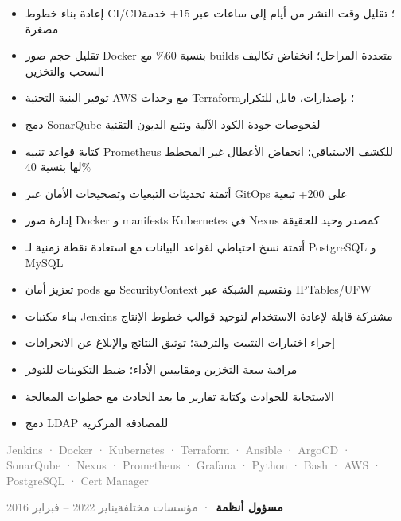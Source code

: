 \documentclass[10pt,a4paper]{article}
\newcommand{\cventry}[3]{\textbf{#1}\ \textcolor{graytext}{· #2}\hfill\textcolor{graytext}{\small #3}\par}
\newcommand{\tagline}[1]{\textcolor{graytext}{\small #1}\par}
\begin{document}
\begin{itemize}
  \item إعادة بناء خطوط CI/CD؛ تقليل وقت النشر من أيام إلى ساعات عبر 15+ خدمة مصغرة
  \item تقليل حجم صور Docker بنسبة 60\% مع builds متعددة المراحل؛ انخفاض تكاليف السحب والتخزين
  \item توفير البنية التحتية AWS مع وحدات Terraform؛ بإصدارات، قابل للتكرار
  \item دمج SonarQube لفحوصات جودة الكود الآلية وتتبع الديون التقنية
  \item كتابة قواعد تنبيه Prometheus للكشف الاستباقي؛ انخفاض الأعطال غير المخطط لها بنسبة 40\%
  \item أتمتة تحديثات التبعيات وتصحيحات الأمان عبر GitOps على 200+ تبعية
  \item إدارة صور Docker و manifests Kubernetes في Nexus كمصدر وحيد للحقيقة
  \item أتمتة نسخ احتياطي لقواعد البيانات مع استعادة نقطة زمنية لـ PostgreSQL و MySQL
  \item تعزيز أمان pods مع SecurityContext وتقسيم الشبكة عبر IPTables/UFW
  \item بناء مكتبات Jenkins مشتركة قابلة لإعادة الاستخدام لتوحيد قوالب خطوط الإنتاج
  \item إجراء اختبارات التثبيت والترقية؛ توثيق النتائج والإبلاغ عن الانحرافات
  \item مراقبة سعة التخزين ومقاييس الأداء؛ ضبط التكوينات للتوفر
  \item الاستجابة للحوادث وكتابة تقارير ما بعد الحادث مع خطوات المعالجة
  \item دمج LDAP للمصادقة المركزية
\end{itemize}
\tagline{Jenkins · Docker · Kubernetes · Terraform · Ansible · ArgoCD · SonarQube · Nexus · Prometheus · Grafana · Python · Bash · AWS · PostgreSQL · Cert Manager}
\vspace{1pt}
\vspace{3pt}
\cventry{مسؤول أنظمة}{مؤسسات مختلفة}{يناير 2022 – فبراير 2016}
\end{document}
